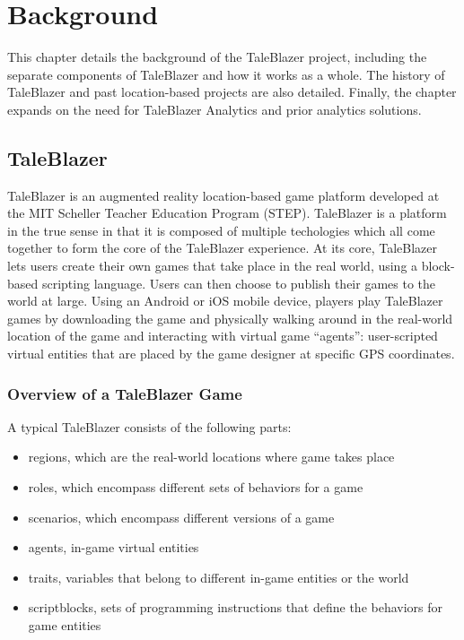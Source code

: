\chapter{Background}

This chapter details the background of the TaleBlazer project, including the separate components of TaleBlazer and how it works as a whole. The history of TaleBlazer and past location-based projects are also detailed. Finally, the chapter expands on the need for TaleBlazer Analytics and prior analytics solutions. 

\section{TaleBlazer}

TaleBlazer is an augmented reality location-based game platform developed at the MIT Scheller Teacher Education Program (STEP). TaleBlazer is a platform in the true sense in that it is composed of multiple techologies which all come together to form the core of the TaleBlazer experience. At its core, TaleBlazer lets users create their own games that take place in the real world, using a block-based scripting language. Users can then choose to publish their games to the world at large. Using an Android or iOS mobile device, players play TaleBlazer games by downloading the game and physically walking around in the real-world location of the game and interacting with virtual game ``agents'': user-scripted virtual entities that are placed by the game designer at specific GPS coordinates.

\subsection{Overview of a TaleBlazer Game}

A typical TaleBlazer consists of the following parts: 
	\begin{itemize}
		\item regions, which are the real-world locations where game takes place
		\item roles, which encompass different sets of behaviors for a game
		\item scenarios, which encompass different versions of a game
		\item agents, in-game virtual entities
		\item traits, variables that belong to different in-game entities or the world
		\item scriptblocks, sets of programming instructions that define the behaviors for game entities
	\end{itemize}

